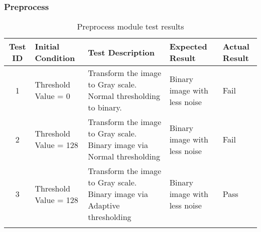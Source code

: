 \documentclass[a4paper,10pt]{iesreport}
\begin{document}
\subsubsection*{Preprocess}
\begin{table}
\caption{Preprocess module test results}
\begin{tabular}{c|p{3cm}|p{3.5cm}|p{3.2cm}|p{2.5cm}}
\hline
\textbf{Test ID} & \textbf{Initial Condition} & \textbf{Test Description} & \textbf{Expected Result}  & \textbf{Actual Result} \\ [0.3ex]
\hline
1 & Threshold Value = 0 & Transform the image to Gray scale. Normal thresholding to binary. & Binary image with less noise & Fail\\
\hline
2 & Threshold Value = 128 & Transform the image to Gray scale. Binary image via Normal thresholding & Binary image with less noise & Fail \\
\hline
3 & Threshold Value = 128 & Transform the image to Gray scale. Binary image via Adaptive thresholding & Binary image with less noise & Pass\\
\\
\hline
\end{tabular}
\label{table:nonlin}
\end{table}
\end{document}
